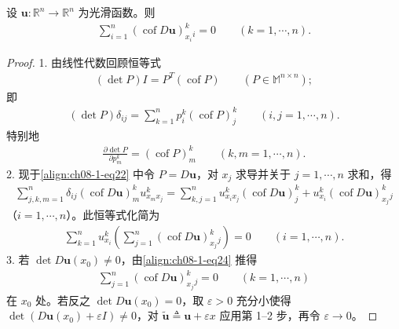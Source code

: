 \documentclass[../../main.tex]{subfiles}
\begin{document}
\begin{lemma}[各行无散]\label{lemma:ch08-1-各行无散}
设 $\mathbf{u}:\mathbb{R}^n\to\mathbb{R}^n$ 为光滑函数。则
\begin{align}
\sum_{i=1}^n(\operatorname{cof}D\mathbf{u})_{x_i}^k{}_i=0\qquad (k=1,\cdots,n).\label{align:ch08-1-eq20}
\end{align}
\begin{proof}
1. 由线性代数回顾恒等式
\begin{align}
(\det P)I=P^T(\operatorname{cof}P)\qquad (P\in\mathbb{M}^{n\times n});\label{align:ch08-1-eq21}
\end{align}
即
\begin{align}
(\det P)\delta_{ij}=\sum_{k=1}^n p_i^k(\operatorname{cof}P)_j^k\qquad (i,j=1,\cdots,n).\label{align:ch08-1-eq22}
\end{align}
特别地
\begin{align}
\frac{\partial\det P}{\partial p_m^k}=(\operatorname{cof}P)_m^k\qquad (k,m=1,\cdots,n).\label{align:ch08-1-eq23}
\end{align}
2. 现于\eqref{align:ch08-1-eq22} 中令 $P=D\mathbf{u}$，对 $x_j$ 求导并关于 $j=1,\cdots,n$ 求和，得
\begin{align*}
\sum_{j,k,m=1}^n\delta_{ij}(\operatorname{cof}D\mathbf{u})_m^k u_{x_mx_j}^k=\sum_{k,j=1}^n u_{x_ix_j}^k(\operatorname{cof}D\mathbf{u})_j^k+u_{x_i}^k(\operatorname{cof}D\mathbf{u})_{x_j}^k{}_j
\end{align*}
（$i=1,\cdots,n$）。此恒等式化简为
\begin{align}
\sum_{k=1}^n u_{x_i}^k\left(\sum_{j=1}^n(\operatorname{cof}D\mathbf{u})_{x_j}^k{}_j\right)=0\qquad (i=1,\cdots,n).\label{align:ch08-1-eq24}
\end{align}
3. 若 $\det D\mathbf{u}(x_0)\neq 0$，由\eqref{align:ch08-1-eq24} 推得
\begin{align*}
\sum_{j=1}^n(\operatorname{cof}D\mathbf{u})_{x_j}^k{}_j=0\qquad (k=1,\cdots,n)
\end{align*}
在 $x_0$ 处。若反之 $\det D\mathbf{u}(x_0)=0$，取 $\varepsilon>0$ 充分小使得 $\det(D\mathbf{u}(x_0)+\varepsilon I)\neq 0$，对 $\widetilde{\mathbf{u}}\triangleq\mathbf{u}+\varepsilon x$ 应用第 1--2 步，再令 $\varepsilon\to 0$。
\end{proof}
\end{lemma}
\end{document}
